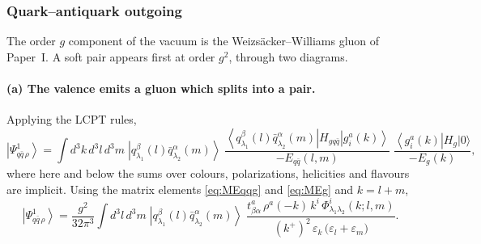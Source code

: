 \documentclass[11pt,a4paper]{article}
\numberwithin{equation}{section}
\newcommand{\eps}{\varepsilon}
\newcommand{\ket}[1]{\left|#1\right\rangle}
\newcommand{\bra}[1]{\left\langle#1\right|}
\newcommand{\vac}{|0\rangle}
\newcommand{\Ph}{\Phi}
\newcommand{\qk}[3]{q^{#1}_{#2}(#3)}
\newcommand{\aqk}[3]{\bar q^{#1}_{#2}(#3)}
\newcommand{\gl}[3]{g^{#1}_{#2}(#3)}
\begin{document}
\subsubsection{Quark--antiquark outgoing}

The order $g$ component of the vacuum is the Weizs\"acker--Williams gluon of Paper~I. A soft pair
appears first at order $g^{2}$, through two diagrams.

\paragraph{(a) The valence emits a gluon which splits into a pair.}
\begin{center}
\end{center}
Applying the LCPT rules,
\begin{equation}
\ket{\Psi^{1}_{q\bar q\,\rho}}=\int\! d^{3}k\,d^{3}l\,d^{3}m\;
\ket{\qk{\beta}{\lambda_{1}}{l}\aqk{\alpha}{\lambda_{2}}{m}}\;
\frac{\bra{\qk{\beta}{\lambda_{1}}{l}\aqk{\alpha}{\lambda_{2}}{m}}H_{gq\bar q}\ket{\gl{a}{i}{k}}}
{-E_{q\bar q}(l,m)}\;
\frac{\bra{\gl{a}{i}{k}}H_{g}\vac}{-E_{g}(k)} ,
\label{eq:Pvac1def}
\end{equation}
where here and below the sums over colours, polarizations, helicities and flavours are implicit.
Using the matrix elements \eqref{eq:MEqqg} and \eqref{eq:MEg} and $k=l+m$,
\begin{equation}
\ket{\Psi^{1}_{q\bar q\,\rho}}=\frac{g^{2}}{32\pi^{3}}\int\!d^{3}l\,d^{3}m\;
\ket{\qk{\beta}{\lambda_{1}}{l}\aqk{\alpha}{\lambda_{2}}{m}}\;
\frac{t^{a}_{\beta\alpha}\,\rho^{a}(-k)\,k^{i}\,\Ph^{i}_{\lambda_{1}\lambda_{2}}(k;l,m)}
{(k^{+})^{2}\,\eps_{k}\,\big(\eps_{l}+\eps_{m}\big)} .
\label{eq:Pvac1}
\end{equation}
\end{document}

